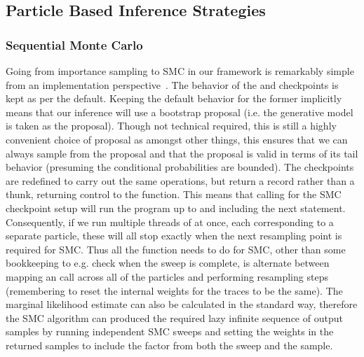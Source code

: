 
\subsection{Particle Based Inference Strategies}
\label{sec:proginf:str:part}

\subsubsection{Sequential Monte Carlo}
\label{sec:proginf:str:part:smc}

Going from importance sampling to SMC in our framework is remarkably simple
from an implementation perspective~\citep{wood2014new}.  The behavior of the \sample and  
checkpoints is kept as per the default.  Keeping the default behavior for the former implicitly means that our
inference will use a bootstrap proposal (i.e. the generative model is taken as the proposal).
Though not technical required, this is still a highly convenient choice of proposal as
amongst other things, this ensures that we can always sample from the proposal and
that the proposal is valid in terms of its tail behavior (presuming the conditional probabilities
are bounded).
The \observe checkpoints are redefined
to carry out the same operations, but return a  record rather
than a thunk, returning control to the \anginfer function.  This means that 
calling  for the SMC checkpoint setup will run the program up to and including
the next \observe statement.  Consequently, if we run multiple threads of  at
once, each corresponding to a separate particle, these will all stop exactly when
the next resampling point is required for SMC.  Thus all the \anginfer function needs
to do for SMC, other than some bookkeeping to e.g. check when the sweep is complete,
is alternate between mapping an  call across all of the particles and
performing resampling steps (remembering to reset the internal weights for the traces to
be the same).  The marginal likelihood estimate can also be calculated in
the standard way, therefore the SMC algorithm can produced the required lazy infinite sequence
of output samples by running independent SMC sweeps and setting the weights in the returned
samples to include the factor from both the sweep and the sample.

